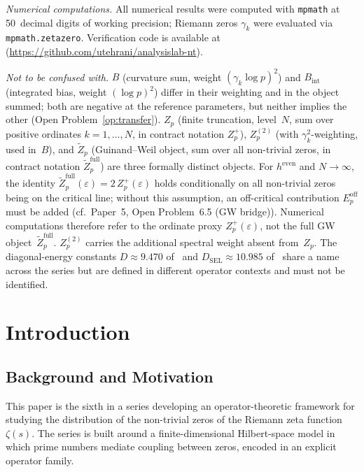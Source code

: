 \documentclass[11pt]{article}
\newcommand{\DSEL}{D_{\mathrm{SEL}}}
\begin{document}
\medskip
\emph{Numerical computations.}
All numerical results were computed with \texttt{mpmath}
at 50~decimal digits of working precision;
Riemann zeros $\gamma_k$ were evaluated via
\texttt{mpmath.zetazero}.
Verification code is available at~\cite{Code}
(\url{https://github.com/utehrani/analysislab-nt}).

\medskip
\emph{Not to be confused with.}
$B$ (curvature sum, weight $(\gamma_k\log p)^2$) and $B_{\mathrm{int}}$
(integrated bias, weight $(\log p)^2$) differ in their weighting and
in the object summed; both are negative at the reference parameters,
but neither implies the other (Open Problem~\ref{op:transfer}).
$Z_p$ (finite truncation, level~$N$, sum over positive ordinates
$k=1,\ldots,N$, in contract notation $Z_p^{+}$),
$Z_p^{(2)}$ (with $\gamma_k^2$-weighting, used in~$B$), and
$\widetilde Z_p$ (Guinand--Weil object, sum over all non-trivial zeros,
in contract notation $\widetilde Z_p^{\mathrm{full}}$) are three
formally distinct objects. For $h^{\mathrm{even}}$ and $N\to\infty$, the identity
$\widetilde Z_p^{\mathrm{full}}(\varepsilon) = 2\,Z_p^{+}(\varepsilon)$
holds conditionally on all non-trivial zeros being on the critical line;
without this assumption, an off-critical contribution $E_p^{\mathrm{off}}$
must be added (cf.\ Paper~5, Open Problem~6.5 (GW bridge)).
Numerical computations therefore refer to the ordinate proxy
$Z_p^{+}(\varepsilon)$, not the full GW object~$\widetilde Z_p^{\mathrm{full}}$.
$Z_p^{(2)}$ carries the additional spectral weight absent from~$Z_p$.
The diagonal-energy constants $D\approx 9.470$ of~\cite{Paper2} and
$\DSEL\approx 10.985$ of~\cite{Paper5} share a name across the series
but are defined in different operator contexts and must not be
identified.

\newpage

\section{Introduction}
\label{sec:intro}

\subsection{Background and Motivation}

This paper is the sixth in a series developing an operator-theoretic
framework for studying the distribution of the non-trivial zeros of
the Riemann zeta function $\zeta(s)$.
The series is built around a finite-dimensional Hilbert-space model in
which prime numbers mediate coupling between zeros, encoded in an
explicit operator family.
\end{document}
